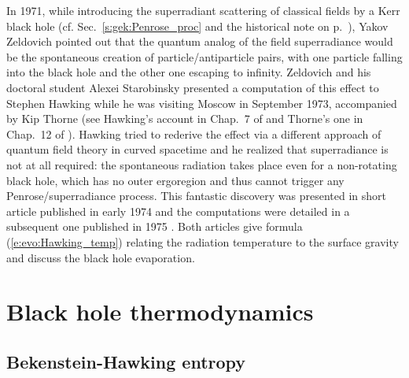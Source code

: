 \begin{hist} \label{h:evo:Hawking_rad}
In 1971, while introducing the superradiant scattering
of classical fields by a Kerr black hole
(cf. Sec.~\ref{s:gek:Penrose_proc} and
the historical note on p.~\pageref{h:gek:Penrose_superradiance}),
Yakov Zeldovich \cite{Zeldo71} pointed out that the quantum analog of the field superradiance
would be the spontaneous creation of particle/antiparticle pairs,  with one particle falling into the black hole
and the other one escaping to infinity. Zeldovich and his doctoral student Alexei Starobinsky presented a computation of this effect to Stephen Hawking while he was visiting Moscow
in September 1973, accompanied by Kip Thorne (see Hawking's account in Chap.~7 of \cite{Hawki88} and Thorne's one in Chap.~12 of \cite{Thorn94}).
Hawking tried to rederive the effect via a different approach
of quantum field theory in curved spacetime and he realized that superradiance
is not at all required: the spontaneous radiation takes place even for
a non-rotating black hole, which has no outer ergoregion and thus cannot trigger
any Penrose/superradiance process. This fantastic discovery was presented
in short article published in early 1974 \cite{Hawki74} and the computations were detailed in a subsequent one published in 1975 \cite{Hawki75}. Both articles give formula (\ref{e:evo:Hawking_temp})
relating the radiation temperature to the surface gravity and discuss the black hole evaporation.
\end{hist}


\section{Black hole thermodynamics}

\subsection{Bekenstein-Hawking entropy} \label{s:evo:BH_entropy}

